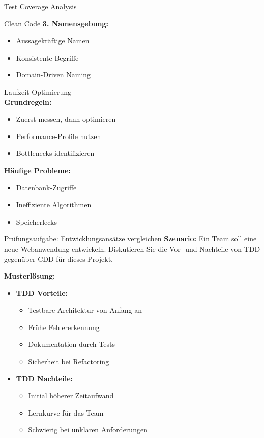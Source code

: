 \begin{example2}{Test Coverage Analysis}
\begin{KR}{Clean Code}
\textbf{3. Namensgebung:}
\begin{itemize}
    \item Aussagekräftige Namen
    \item Konsistente Begriffe
    \item Domain-Driven Naming
\end{itemize}
\end{KR}

\begin{concept}{Laufzeit-Optimierung}\\
\textbf{Grundregeln:}
\begin{itemize}
    \item Zuerst messen, dann optimieren
    \item Performance-Profile nutzen
    \item Bottlenecks identifizieren
\end{itemize}

\textbf{Häufige Probleme:}
\begin{itemize}
    \item Datenbank-Zugriffe
    \item Ineffiziente Algorithmen
    \item Speicherlecks
\end{itemize}
\end{concept}

\begin{example2}{Prüfungsaufgabe: Entwicklungsansätze vergleichen}
\textbf{Szenario:}
Ein Team soll eine neue Webanwendung entwickeln. Diskutieren Sie die Vor- und Nachteile 
von TDD gegenüber CDD für dieses Projekt.

\textbf{Musterlösung:}
\begin{itemize}
    \item \textbf{TDD Vorteile:}
    \begin{itemize}
        \item Testbare Architektur von Anfang an
        \item Frühe Fehlererkennung
        \item Dokumentation durch Tests
        \item Sicherheit bei Refactoring
    \end{itemize}
    
    \item \textbf{TDD Nachteile:}
    \begin{itemize}
        \item Initial höherer Zeitaufwand
        \item Lernkurve für das Team
        \item Schwierig bei unklaren Anforderungen
    \end{itemize}
    

\end{itemize}
\end{example2}
\end{example2}
